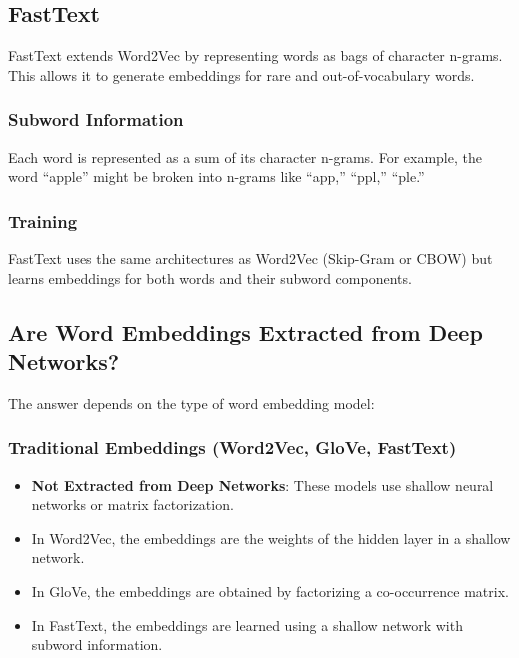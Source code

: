 \begin{notechapter}
\subsection{FastText}
FastText extends Word2Vec by representing words as bags of 
character n-grams. This allows it to generate embeddings for rare 
and out-of-vocabulary words.

\subsubsection{Subword Information}
Each word is represented as a sum of its character n-grams. For 
example, the word ``apple'' might be broken into n-grams like 
``app,'' ``ppl,'' ``ple.''

\subsubsection{Training}
FastText uses the same architectures as Word2Vec (Skip-Gram or 
CBOW) but learns embeddings for both words and their subword 
components.

\subsection{Are Word Embeddings Extracted from Deep Networks?}
The answer depends on the type of word embedding model:

\subsubsection{Traditional Embeddings (Word2Vec, GloVe, FastText)}
\begin{itemize}
    \item \textbf{Not Extracted from Deep Networks}: These models 
    use shallow neural networks or matrix factorization.
    \item In Word2Vec, the embeddings are the weights of the 
    hidden layer in a shallow network.
    \item In GloVe, the embeddings are obtained by factorizing a 
    co-occurrence matrix.
    \item In FastText, the embeddings are learned using a shallow 
    network with subword information.
\end{itemize}


\end{notechapter}

